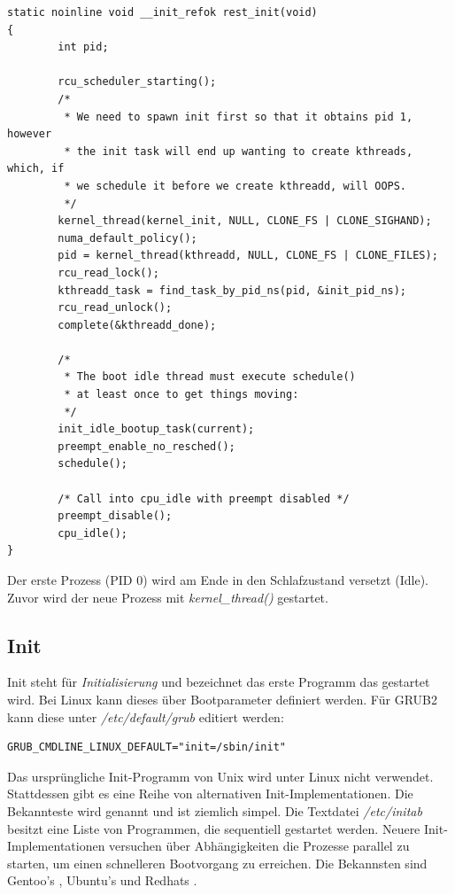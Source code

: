 \begin{lstlisting}[label=start_kernel,caption=linux/init/main.c]
static noinline void __init_refok rest_init(void)
{
        int pid;

        rcu_scheduler_starting();
        /*
         * We need to spawn init first so that it obtains pid 1, however
         * the init task will end up wanting to create kthreads, which, if
         * we schedule it before we create kthreadd, will OOPS.
         */
        kernel_thread(kernel_init, NULL, CLONE_FS | CLONE_SIGHAND);
        numa_default_policy();
        pid = kernel_thread(kthreadd, NULL, CLONE_FS | CLONE_FILES);
        rcu_read_lock();
        kthreadd_task = find_task_by_pid_ns(pid, &init_pid_ns);
        rcu_read_unlock();
        complete(&kthreadd_done);

        /*
         * The boot idle thread must execute schedule()
         * at least once to get things moving:
         */
        init_idle_bootup_task(current);
        preempt_enable_no_resched();
        schedule();

        /* Call into cpu_idle with preempt disabled */
        preempt_disable();
        cpu_idle();
}
\end{lstlisting}

Der erste Prozess (PID 0) wird am Ende in den Schlafzustand versetzt (Idle). Zuvor wird der neue Prozess
mit \emph{kernel\_thread()} gestartet.

\subsection{Init}

Init steht für \emph{Initialisierung} und bezeichnet das erste Programm das gestartet wird. Bei Linux kann
dieses über Bootparameter definiert werden. Für GRUB2 kann diese unter \emph{/etc/default/grub} editiert werden:

\begin{lstlisting}[caption=/etc/default/grub]
GRUB_CMDLINE_LINUX_DEFAULT="init=/sbin/init"
\end{lstlisting}

Das ursprüngliche Init-Programm von Unix wird unter Linux nicht verwendet. Stattdessen gibt es eine Reihe von
alternativen Init-Implementationen. Die Bekannteste wird  genannt und ist ziemlich simpel.
Die Textdatei \emph{/etc/initab} besitzt eine Liste von Programmen, die sequentiell gestartet werden. Neuere
Init-Implementationen versuchen über Abhängigkeiten die Prozesse parallel zu starten, um einen schnelleren
Bootvorgang zu erreichen. Die Bekannsten sind Gentoo's , Ubuntu's  und
Redhats .

